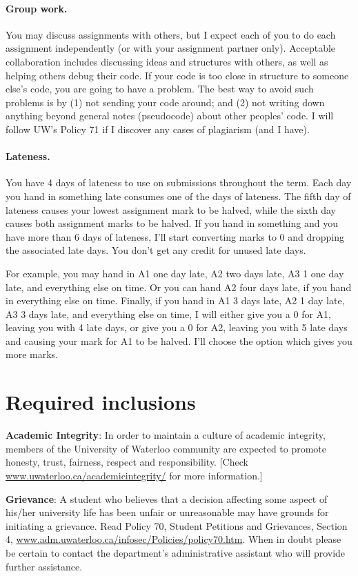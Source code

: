 \documentclass{article}
\begin{document}
\paragraph{Group work.} 
You may discuss assignments with others, but I expect each of you to
do each assignment independently (or with your assignment partner only). Acceptable collaboration includes
discussing ideas and structures with others, as well as helping others
debug their code. If your code is too close in structure to someone
else's code, you are going to have a problem. The best way to avoid
such problems is by (1) not sending your code around; and (2) not
writing down anything beyond general notes (pseudocode) about other
peoples' code. I will follow UW's Policy 71 if I discover any cases of
plagiarism (and I have). 

\paragraph{Lateness.} You have 4 days of lateness to use on 
submissions throughout the term. Each day you hand in something late
consumes one of the days of lateness. The fifth day of lateness causes
your lowest assignment mark to be halved, while the sixth day causes
both assignment marks to be halved. If you hand in something and you
have more than 6 days of lateness, I'll start converting marks to 0
and dropping the associated late days. You don't
get any credit for unused late days.

For example, you may hand in A1 one day late, A2 two days late, A3 1
one day late, and everything else on time.  Or you can hand A2 four
days late, if you hand in everything else on time. Finally, if you
hand in A1 3 days late, A2 1 day late, A3 3 days late, and
everything else on time, I will either give you a 0 for A1, leaving you
with 4 late days, or give you a 0 for A2, leaving you with 5 late days
and causing your mark for A1 to be halved. I'll choose the option
which gives you more marks.

\newpage
\section*{Required inclusions}
{\bf Academic Integrity}: In order to maintain a culture of academic
integrity, members of the University of Waterloo community are
expected to promote honesty, trust, fairness, respect and
responsibility. [Check \url{www.uwaterloo.ca/academicintegrity/} for more
  information.]

\vspace*{1em}\noindent
{\bf Grievance}: A student who believes that a decision affecting some
aspect of his/her university life has been unfair or unreasonable may
have grounds for initiating a grievance. Read Policy 70, Student
Petitions and Grievances, Section 4,
\url{www.adm.uwaterloo.ca/infosec/Policies/policy70.htm}.  When in doubt
please be certain to contact the department’s administrative assistant
who will provide further assistance.
\end{document}
